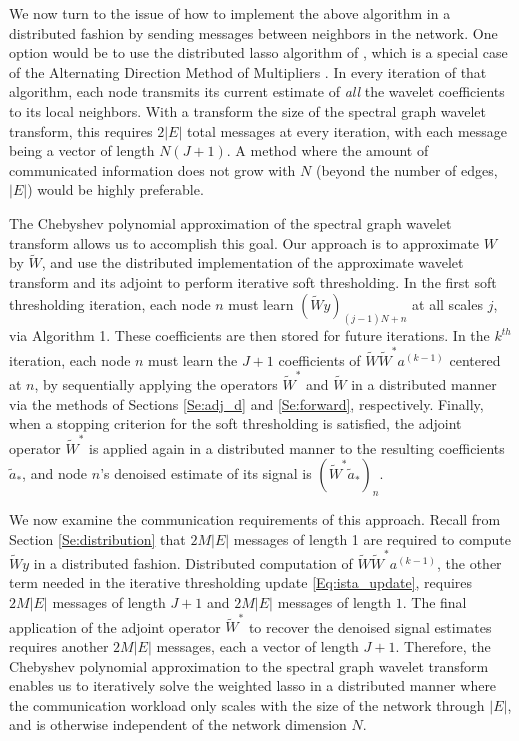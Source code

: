 \documentclass[conference]{IEEEtran}
\newcommand{\card}[1]{\lvert#1\rvert}
\begin{document}
We now turn to the issue of how to implement the above algorithm in a distributed fashion by sending messages between neighbors in the network. One option would be to use the distributed lasso algorithm of \cite{dlasso}, which is a special case of the Alternating Direction Method of Multipliers \cite[p.~253]{par_dist_opt_book}. In every iteration of that algorithm, each node transmits its current estimate of \emph{all} the wavelet coefficients to its local neighbors. With a transform the size of the spectral graph wavelet transform, this requires $2\card{{E}}$ total messages at every iteration, with each message being a vector of length  $N(J+1)$.
A method where the amount of communicated information does not grow with $N$ (beyond the number of edges, $\card{{E}}$) would be highly preferable.

The Chebyshev polynomial approximation of the spectral graph wavelet transform
allows us to accomplish this goal.
Our approach is to approximate $W$ by $\tilde{W}$, and use the distributed implementation of the approximate wavelet transform and its adjoint to
perform iterative soft thresholding.
In the first soft thresholding iteration, each node $n$ must learn $(\tilde{W}y)_{(j-1)N+n}$ at all scales $j$, via Algorithm 1. These coefficients are then stored for future iterations. In the $k^{th}$ iteration, each node $n$ must learn the $J+1$ coefficients of $\tilde{W}\tilde{W}^*{a}^{(k-1)}$ centered at $n$, by sequentially applying the operators $\tilde{W}^*$ and $\tilde{W}$ in a distributed manner via the methods of Sections \ref{Se:adj_d} and \ref{Se:forward}, respectively. Finally, when a stopping criterion for the soft thresholding is satisfied,
the adjoint operator $\tilde{W}^*$ is applied again in a distributed manner to the resulting coefficients $\tilde{{{a}}}_*$, and node $n$'s denoised estimate of its signal is $\left(\tilde{W}^*\tilde{{{a}}}_*\right)_n$.

We now examine the communication requirements of this approach. Recall from Section \ref{Se:distribution} that
$2M\card{{E}}$ messages of length 1 are required to compute $\tilde{W}y$ in a distributed fashion.
Distributed computation of $\tilde{W}\tilde{W}^*{a}^{(k-1)}$, the other term needed in the iterative thresholding update \eqref{Eq:ista_update}, requires $2M\card{{E}}$ messages of length $J+1$ and $2M\card{{E}}$ messages of length $1$. The final application of the adjoint operator $\tilde{W}^*$ to recover the denoised signal estimates requires another $2M\card{{E}}$ messages, each a vector of length $J+1$. Therefore, the Chebyshev polynomial approximation to the spectral graph wavelet transform enables us to iteratively solve the weighted lasso in a distributed manner where the communication workload only scales with the  size of the network through $\card{E}$, and is otherwise independent of the network dimension $N$.
\end{document}
